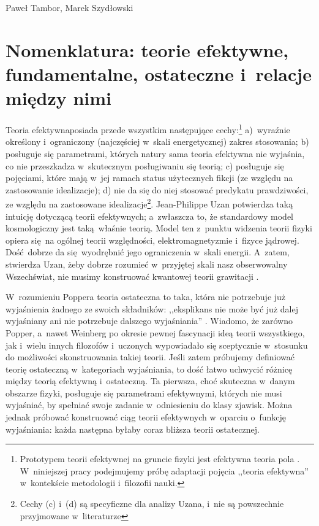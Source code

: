 \begin{artplenv2auth}{Paweł Tambor, Marek Szydłowski}
\section{Nomenklatura: teorie efektywne, fundamentalne, ostateczne i~relacje między nimi}
Teoria efektywnaposiada przede wszystkim następujące cechy:\footnote{Prototypem teorii efektywnej na gruncie fizyki jest efektywna teoria pola
\parencites[][]{kim_wilson_1998}[][]{wilson_renormalization_1971}. %
 W~niniejszej pracy podejmujemy próbę adaptacji pojęcia ,,teoria efektywna'' w~kontekście metodologii i~filozofii nauki.}
 a)~wyraźnie określony i~ograniczony (najczęściej w~skali energetycznej) zakres stosowania; b) posługuje się parametrami, których natury sama teoria efektywna nie wyjaśnia, co nie przeszkadza w~skutecznym posługiwaniu się teorią; c) posługuje się pojęciami, które mają w~jej ramach status użytecznych fikcji (ze względu na zastosowanie idealizacje); d) nie da się do niej stosować predykatu prawdziwości, ze względu na zastosowane idealizacje\footnote{Cechy (c) i~(d) są specyficzne dla analizy Uzana, i~nie są powszechnie przyjmowane w~literaturze}. Jean-Philippe Uzan potwierdza taką intuicję dotyczącą teorii efektywnych; a~zwłaszcza to, że standardowy model kosmologiczny jest taką~właśnie teorią. Model ten z~punktu widzenia teorii fizyki opiera się~na ogólnej teorii względności, elektromagnetyzmie i~fizyce jądrowej. Dość~dobrze da się~wyodrębnić jego ograniczenia w~skali energii. A~zatem, stwierdza Uzan, żeby dobrze rozumieć w~przyjętej skali nasz obserwowalny Wszechświat, nie musimy konstruować kwantowej teorii grawitacji 
\parencite[][s.~109]{uzan_emergent_2017}.%


W~rozumieniu Poppera teoria ostateczna to taka, która nie potrzebuje już wyjaśnienia żadnego ze swoich składników: ,,eksplikans nie może być już dalej wyjaśniany ani nie potrzebuje dalszego wyjaśniania''
\parencite[][s.~159]{popper_wiedza_2002}. %
 Wiadomo, że zarówno Popper, a~nawet Weinberg po okresie pewnej fascynacji ideą teorii wszystkiego, jak i~wielu innych filozofów i~uczonych wypowiadało się sceptycznie w~stosunku do możliwości skonstruowania takiej teorii. Jeśli zatem próbujemy definiować teorię ostateczną w~kategoriach wyjaśniania, to dość łatwo uchwycić różnicę między teorią efektywną i~ostateczną. Ta pierwsza, choć skuteczna w~danym obszarze fizyki, posługuje się parametrami efektywnymi, których nie musi wyjaśniać, by spełniać swoje zadanie w~odniesieniu do klasy zjawisk. Można jednak próbować konstruować ciąg teorii efektywnych w~oparciu o~funkcję wyjaśniania: każda następna byłaby coraz bliższa teorii ostatecznej.


\end{artplenv2auth}
